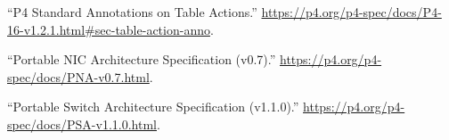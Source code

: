 \documentclass[11pt]{article}
\begin{document}
{{\begin{thebibliography}{44}
\mdbibitemlabel{{}[21]}\textquotedblleft{}P4 Standard Annotations on Table Actions.\textquotedblright{} \href{https://p4.org/p4-spec/docs/P4-16-v1.2.1.html\%23sec-table-action-anno}{{\ttfamily https://\hspace{0pt}p4.\hspace{0pt}org/\hspace{0pt}p4-\hspace{0pt}spec/\hspace{0pt}docs/\hspace{0pt}P4-\hspace{0pt}16-\hspace{0pt}v1.\hspace{0pt}2.\hspace{0pt}1.\hspace{0pt}html\#\hspace{0pt}sec-\hspace{0pt}table-\hspace{0pt}action-\hspace{0pt}anno}}.\label{p4actionannotations}%

\mdbibitemlabel{{}[22]}\textquotedblleft{}Portable NIC Architecture Specification (v0.7).\textquotedblright{} \href{https://p4.org/p4-spec/docs/PNA-v0.7.html}{{\ttfamily https://\hspace{0pt}p4.\hspace{0pt}org/\hspace{0pt}p4-\hspace{0pt}spec/\hspace{0pt}docs/\hspace{0pt}PNA-\hspace{0pt}v0.\hspace{0pt}7.\hspace{0pt}html}}.\label{pna}%

\mdbibitemlabel{{}[23]}\textquotedblleft{}Portable Switch Architecture Specification (v1.1.0).\textquotedblright{} \href{https://p4.org/p4-spec/docs/PSA-v1.1.0.html}{{\ttfamily https://\hspace{0pt}p4.\hspace{0pt}org/\hspace{0pt}p4-\hspace{0pt}spec/\hspace{0pt}docs/\hspace{0pt}PSA-\hspace{0pt}v1.\hspace{0pt}1.\hspace{0pt}0.\hspace{0pt}html}}.\label{psa}%


\end{thebibliography}}}
\end{document}
